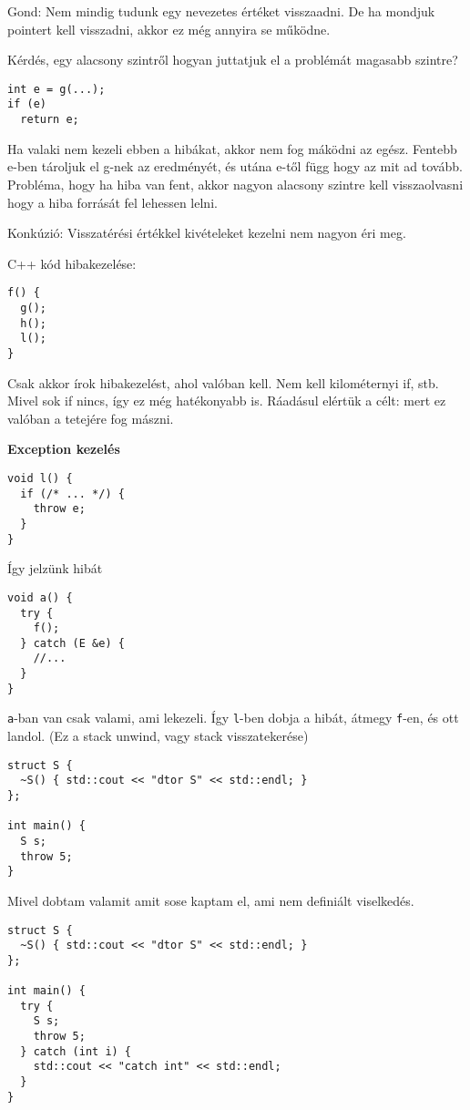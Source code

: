 \documentclass[a4paper,11.5pt]{article}
\begin{document}
		Gond: Nem mindig tudunk egy nevezetes értéket visszaadni. De ha mondjuk pointert kell visszadni, akkor ez még annyira se működne. 
		
		Kérdés, egy alacsony szintről hogyan juttatjuk el a problémát magasabb szintre?
		
		\begin{lstlisting}
int e = g(...);
if (e)
  return e;
		\end{lstlisting}
		
		Ha valaki nem kezeli ebben a hibákat, akkor nem fog máködni az egész. Fentebb e-ben tároljuk el g-nek az eredményét, és utána e-től függ hogy az mit ad tovább. Probléma, hogy ha hiba van fent, akkor nagyon alacsony szintre kell visszaolvasni hogy a hiba forrását fel lehessen lelni.
		
		Konkúzió: Visszatérési értékkel kivételeket kezelni nem nagyon éri meg.
		
		C++ kód hibakezelése:
		
		\begin{lstlisting}
f() {
  g();
  h();
  l();
}
		\end{lstlisting}
		
		Csak akkor írok hibakezelést, ahol valóban kell. Nem kell kilométernyi if, stb. Mivel sok if nincs, így ez még hatékonyabb is. Ráadásul elértük a célt: mert ez valóban a tetejére fog mászni.
		
		\textbf{Exception kezelés}
		
		\begin{lstlisting}
void l() {
  if (/* ... */) {
    throw e;
  }
}
		\end{lstlisting}
		
		Így jelzünk hibát
		
		\begin{lstlisting}
void a() {
  try {
    f();
  } catch (E &e) {
    //...
  }
}
		\end{lstlisting}
		\texttt{a}-ban van csak valami, ami lekezeli. Így \texttt{l}-ben dobja a hibát, átmegy \texttt{f}-en, és ott landol. (Ez a stack unwind, vagy stack visszatekerése)
		
		\begin{lstlisting}
struct S {
  ~S() { std::cout << "dtor S" << std::endl; }
};

int main() {
  S s;
  throw 5;
}
		\end{lstlisting}
		Mivel dobtam valamit amit sose kaptam el, ami nem definiált viselkedés.
		\begin{lstlisting}
struct S {
  ~S() { std::cout << "dtor S" << std::endl; }
};

int main() {
  try {
    S s;
    throw 5;
  } catch (int i) {
    std::cout << "catch int" << std::endl;
  }
}
		\end{lstlisting}
		
\end{document}
